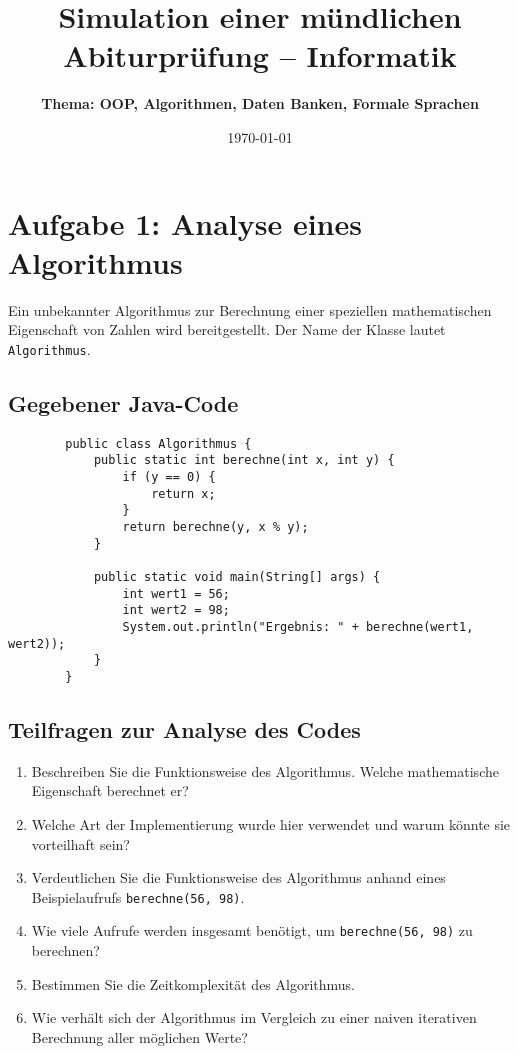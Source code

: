 \documentclass[a4paper,12pt]{article}
\begin{document}
	
	\title{\textbf{Simulation einer mündlichen Abiturprüfung -- Informatik}}
	\author{\textbf{Thema: OOP, Algorithmen, Daten Banken, Formale Sprachen}}
	\date{\today}
	\maketitle
	
	\section*{Aufgabe 1: Analyse eines Algorithmus}
	
	Ein unbekannter Algorithmus zur Berechnung einer speziellen mathematischen Eigenschaft von Zahlen wird bereitgestellt. Der Name der Klasse lautet \texttt{Algorithmus}.
	
	\subsection*{Gegebener Java-Code}
	
	\begin{verbatim}
		public class Algorithmus {
			public static int berechne(int x, int y) {
				if (y == 0) {
					return x;
				}
				return berechne(y, x % y);
			}
			
			public static void main(String[] args) {
				int wert1 = 56;
				int wert2 = 98;
				System.out.println("Ergebnis: " + berechne(wert1, wert2));
			}
		}
	\end{verbatim}
	
	\subsection*{Teilfragen zur Analyse des Codes}
	
	\begin{enumerate}
		\item Beschreiben Sie die Funktionsweise des Algorithmus. Welche mathematische Eigenschaft berechnet er?
		
		\item Welche Art der Implementierung wurde hier verwendet und warum könnte sie vorteilhaft sein?
		
		\item Verdeutlichen Sie die Funktionsweise des Algorithmus anhand eines Beispielaufrufs \texttt{berechne(56, 98)}.
		
		\item Wie viele Aufrufe werden insgesamt benötigt, um \texttt{berechne(56, 98)} zu berechnen?
		
		\item Bestimmen Sie die Zeitkomplexität des Algorithmus.
		
		\item Wie verhält sich der Algorithmus im Vergleich zu einer naiven iterativen Berechnung aller möglichen Werte?
	\end{enumerate}
	
\end{document}
